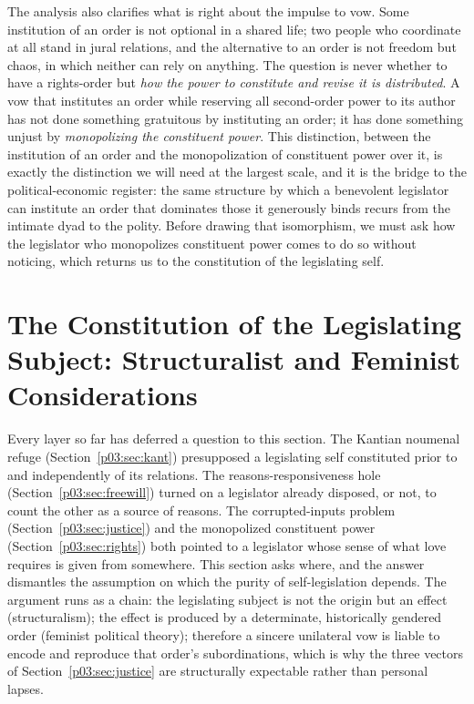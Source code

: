 The analysis also clarifies what is right about the impulse to vow. Some institution of an order is not optional in a shared life; two people who coordinate at all stand in jural relations, and the alternative to an order is not freedom but chaos, in which neither can rely on anything. The question is never whether to have a rights-order but \emph{how the power to constitute and revise it is distributed}. A vow that institutes an order while reserving all second-order power to its author has not done something gratuitous by instituting an order; it has done something unjust by \emph{monopolizing the constituent power}. This distinction, between the institution of an order and the monopolization of constituent power over it, is exactly the distinction we will need at the largest scale, and it is the bridge to the political-economic register: the same structure by which a benevolent legislator can institute an order that dominates those it generously binds recurs from the intimate dyad to the polity. Before drawing that isomorphism, we must ask how the legislator who monopolizes constituent power comes to do so without noticing, which returns us to the constitution of the legislating self.

\section{The Constitution of the Legislating Subject: Structuralist and Feminist Considerations}\label{p03:sec:subject}

Every layer so far has deferred a question to this section. The Kantian noumenal refuge (Section~\ref{p03:sec:kant}) presupposed a legislating self constituted prior to and independently of its relations. The reasons-responsiveness hole (Section~\ref{p03:sec:freewill}) turned on a legislator already disposed, or not, to count the other as a source of reasons. The corrupted-inputs problem (Section~\ref{p03:sec:justice}) and the monopolized constituent power (Section~\ref{p03:sec:rights}) both pointed to a legislator whose sense of what love requires is given from somewhere. This section asks where, and the answer dismantles the assumption on which the purity of self-legislation depends. The argument runs as a chain: the legislating subject is not the origin but an effect (structuralism); the effect is produced by a determinate, historically gendered order (feminist political theory); therefore a sincere unilateral vow is liable to encode and reproduce that order's subordinations, which is why the three vectors of Section~\ref{p03:sec:justice} are structurally expectable rather than personal lapses.

